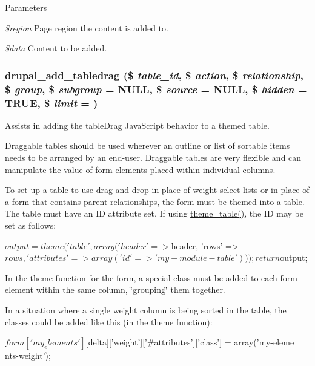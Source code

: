 \begin{DoxyParams}{Parameters}
\item[{\em \$region}]Page region the content is added to. \item[{\em \$data}]Content to be added. \end{DoxyParams}
\hypertarget{common_8inc_ab905af5d90a84b5d48f3a517992875f5}{
\subsubsection[{drupal\_\-add\_\-tabledrag}]{\setlength{\rightskip}{0pt plus 5cm}drupal\_\-add\_\-tabledrag (\$ {\em table\_\-id}, \/  \$ {\em action}, \/  \$ {\em relationship}, \/  \$ {\em group}, \/  \$ {\em subgroup} = {\ttfamily NULL}, \/  \$ {\em source} = {\ttfamily NULL}, \/  \$ {\em hidden} = {\ttfamily TRUE}, \/  \$ {\em limit} = {})}}
\label{common_8inc_ab905af5d90a84b5d48f3a517992875f5}
Assists in adding the tableDrag JavaScript behavior to a themed table.

Draggable tables should be used wherever an outline or list of sortable items needs to be arranged by an end-\/user. Draggable tables are very flexible and can manipulate the value of form elements placed within individual columns.

To set up a table to use drag and drop in place of weight select-\/lists or in place of a form that contains parent relationships, the form must be themed into a table. The table must have an ID attribute set. If using \hyperlink{group__themeable_ga9e35aa108c35f87b588197138a51823d}{theme\_\-table()}, the ID may be set as follows: 
\begin{DoxyCode}
 $output = theme('table', array('header' => $header, 'rows' => $rows, 'attributes
      ' => array('id' => 'my-module-table')));
 return $output;
\end{DoxyCode}


In the theme function for the form, a special class must be added to each form element within the same column, \char`\"{}grouping\char`\"{} them together.

In a situation where a single weight column is being sorted in the table, the classes could be added like this (in the theme function): 
\begin{DoxyCode}
 $form['my_elements'][$delta]['weight']['#attributes']['class'] = array('my-eleme
      nts-weight');
\end{DoxyCode}


